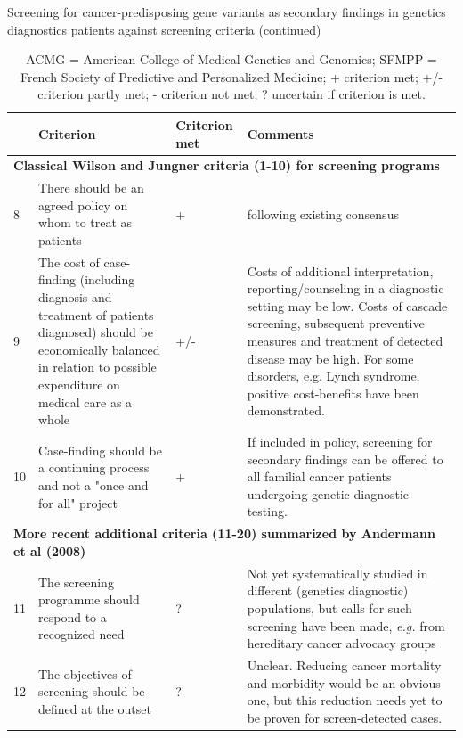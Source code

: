 \begin{table}
	\footnotesize
	\caption*{\label{table:summary}Screening for cancer-predisposing gene variants as secondary findings in genetics diagnostics patients against screening criteria (continued)}
	\begin{tabular}{ p{0.5cm} p{5.5cm} p{2cm} p{7cm} }
		& \footnotesize{\textbf{Criterion}} & \footnotesize{\textbf{Criterion met}} & \footnotesize{\textbf{Comments}} \\
		\hline 
		\multicolumn{4}{l}{\textbf{Classical Wilson and Jungner criteria (1-10) for screening programs \cite{Andermann_2008}}} \\
		\hline 

		8 & There should be an agreed policy on whom to treat as patients & + & following existing consensus \\
		9 & The cost of case-finding (including diagnosis and treatment of patients diagnosed) should be economically balanced in relation to possible expenditure on medical care as a whole & +/- & Costs of additional interpretation, reporting/counseling in a diagnostic setting may be low. Costs of cascade screening, subsequent preventive measures and treatment of detected disease may be high. For some disorders, e.g. Lynch syndrome, positive cost-benefits have been demonstrated. \\
		10 & Case-finding should be a continuing process and not a "once and for all" project & + & If included in policy, screening for secondary findings can be offered to all familial cancer patients undergoing genetic diagnostic testing. \newline \\
		
		\hline 
		\multicolumn{4}{l}{\textbf{More recent additional criteria (11-20) summarized by Andermann et al (2008) \cite{Andermann_2008}}} \\
		\hline 
		11 & The screening programme should respond to a recognized need & ? & Not yet systematically studied in different (genetics diagnostic) populations, but calls for such screening have been made, \textsl{e.g.} from hereditary cancer advocacy groups \\
		12 & The objectives of screening should be defined at the outset & ? & Unclear. Reducing cancer mortality and morbidity would be an obvious one, but this reduction needs yet to be proven for screen-detected cases. \\
		\hline
	\end{tabular}
	\caption*{ACMG = American College of Medical Genetics and Genomics; SFMPP = French Society of Predictive and Personalized Medicine; + criterion met; +/- criterion partly met; - criterion not met; ? uncertain if criterion is met.}
\end{table}

